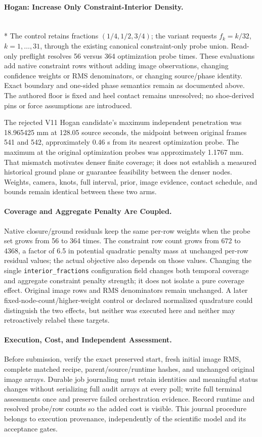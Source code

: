 \documentclass[11pt,letterpaper]{article}
\newcommand{\code}[1]{\nolinkurl{#1}}
\begin{document}
\paragraph{Hogan: Increase Only Constraint-Interior Density.}\mbox{}\\*
The control retains fractions $(1/4,1/2,3/4)$; the variant requests
$f_k=k/32$, $k=1,\ldots,31$, through the existing canonical constraint-only
probe union. Read-only preflight resolves 56 versus 364 optimization probe
times. These evaluations add native constraint rows without adding image
observations, changing confidence weights or RMS denominators, or changing
source/phase identity. Exact boundary and one-sided phase semantics remain
as documented above. The authored floor is fixed and heel contact remains
unresolved; no shoe-derived pins or force assumptions are introduced.

The rejected V11 Hogan candidate's maximum independent penetration was
18.965425 mm at 128.05 source seconds, the midpoint between original frames
541 and 542, approximately 0.46 s from its nearest optimization probe. The
maximum at the original optimization probes was approximately 1.1767 mm.
That mismatch motivates denser finite coverage; it does not establish a
measured historical ground plane or guarantee feasibility between the denser
nodes. Weights, camera, knots, full interval, prior, image evidence, contact
schedule, and bounds remain identical between these two arms.

\paragraph{Coverage and Aggregate Penalty Are Coupled.}
Native closure/ground residuals keep the same per-row weights when the probe
set grows from 56 to 364 times. The constraint row count grows from 672
to 4368, a factor of 6.5 in potential quadratic penalty mass at unchanged
per-row residual values; the actual objective also depends on those values. Changing the single \code{interior_fractions} configuration field
changes both temporal coverage and aggregate constraint penalty strength;
it does not isolate a pure coverage effect. Original image rows and RMS
denominators remain unchanged. A later fixed-node-count/higher-weight control
or declared normalized quadrature could distinguish the two effects, but
neither was executed here and neither may retroactively relabel these targets.


\paragraph{Execution, Cost, and Independent Assessment.}
Before submission, verify the exact preserved start, fresh initial image RMS,
complete matched recipe, parent/source/runtime hashes, and unchanged original
image arrays. Durable job journaling must retain identities and meaningful
status changes without serializing full audit arrays at every poll; write full
terminal assessments once and preserve failed orchestration evidence. Record
runtime and resolved probe/row counts so the added cost is visible. This
journal procedure belongs to execution provenance, independently of the
scientific model and its acceptance gates.
\end{document}
